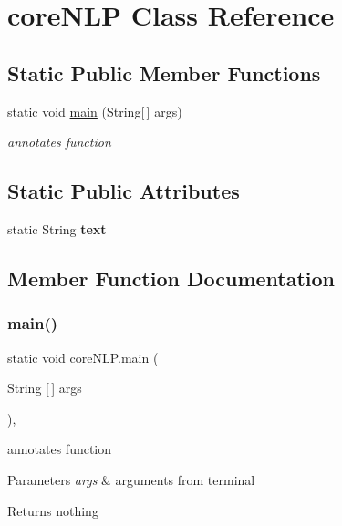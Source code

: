 \hypertarget{classcoreNLP}{}\section{core\+N\+LP Class Reference}
\label{classcoreNLP}
\subsection*{Static Public Member Functions}
\begin{DoxyCompactItemize}
\item 
static void \hyperlink{classcoreNLP_a2b86877b0227570261791c53196a1f4b}{main} (String\mbox{[}$\,$\mbox{]} args)
\begin{DoxyCompactList}\small\item\em annotates function \end{DoxyCompactList}\end{DoxyCompactItemize}
\subsection*{Static Public Attributes}
\begin{DoxyCompactItemize}
\item 
static String {\bfseries text}
\end{DoxyCompactItemize}


\subsection{Member Function Documentation}
\mbox{\label{classcoreNLP_a2b86877b0227570261791c53196a1f4b}} 
\subsubsection{\texorpdfstring{main()}{main()}}
{\footnotesize\ttfamily static void core\+N\+L\+P.\+main (\begin{DoxyParamCaption}\item[{String \mbox{[}$\,$\mbox{]}}]{args }\end{DoxyParamCaption})\hspace{0.3cm}{\ttfamily [inline]}, {\ttfamily [static]}}



annotates function 


\begin{DoxyParams}{Parameters}
{\em args} & arguments from terminal \\
\hline
\end{DoxyParams}
\begin{DoxyReturn}{Returns}
nothing 
\end{DoxyReturn}


